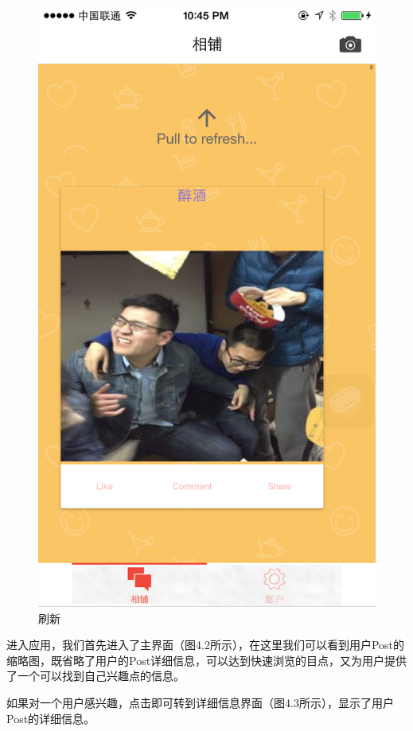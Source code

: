 \begin{figure}[h]
\begin{minipage}[t]{0.3\linewidth}
\includegraphics[width=\textwidth]{img/chap4/info3.PNG}
\caption{刷新\label{snapchat}}
\end{minipage}
\hfill
\end{figure}

进入应用，我们首先进入了主界面（图4.2所示），在这里我们可以看到用户Post的缩略图，既省略了用户的Post详细信息，可以达到快速浏览的目点，又为用户提供了一个可以找到自己兴趣点的信息。

如果对一个用户感兴趣，点击即可转到详细信息界面（图4.3所示），显示了用户Post的详细信息。

